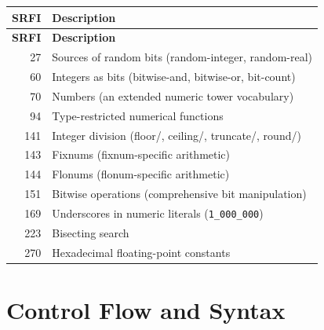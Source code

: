 \begin{longtable}{rp{9cm}}
\textbf{SRFI} & \textbf{Description} \\
\hline
\endfirsthead
\textbf{SRFI} & \textbf{Description} \\
\hline
\endhead
27 & Sources of random bits (random-integer, random-real) \\
60 & Integers as bits (bitwise-and, bitwise-or, bit-count) \\
70 & Numbers (an extended numeric tower vocabulary) \\
94 & Type-restricted numerical functions \\
141 & Integer division (floor/, ceiling/, truncate/, round/) \\
143 & Fixnums (fixnum-specific arithmetic) \\
144 & Flonums (flonum-specific arithmetic) \\
151 & Bitwise operations (comprehensive bit manipulation) \\
169 & Underscores in numeric literals (\texttt{1\_000\_000}) \\
223 & Bisecting search \\
270 & Hexadecimal floating-point constants \\
\end{longtable}

\section{Control Flow and Syntax}


